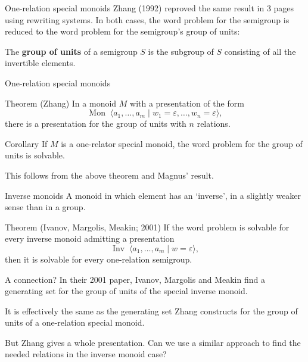 \documentclass{beamer}
\let\epsilon\varepsilon
\newcommand{\Mon}{\operatorname{Mon}\;}
\newcommand{\Inv}{\operatorname{Inv}\;}
\newcommand{\pskip}{\medskip}
\begin{document}
\begin{frame}{One-relation special monoids}
	Zhang (1992) reproved the same result in 3 pages using rewriting systems. In both cases, the word problem for the semigroup is reduced to the word problem for the semigroup's group of units:\pskip

	\pause
	The \textbf{group of units} of a semigroup $S$ is the subgroup of $S$ consisting of all the invertible elements.
\end{frame}

\begin{frame}{One-relation special monoids}
	\begin{block}{Theorem (Zhang)}
		In a monoid $M$ with a presentation of the form
			\[ \Mon \langle a_1, \ldots, a_m \mid w_1 = \epsilon, \ldots, w_n = \epsilon \rangle, \]
		there is a presentation for the group of units with $n$ relations.
	\end{block}

	\pause
	\begin{block}{Corollary}
		If $M$ is a one-relator special monoid, the word problem for the group of units is solvable.
	\end{block}

	This follows from the above theorem and Magnus' result.
\end{frame}


\begin{frame}{Inverse monoids}
	A monoid in which element has an `inverse', in a slightly weaker sense than in a group.

	\pause
	\begin{block}{Theorem (Ivanov, Margolis, Meakin; 2001)}
		If the word problem is solvable for every inverse monoid admitting a presentation
			\[ \Inv \langle a_1, \ldots, a_m \mid w = \epsilon \rangle, \]
		then it is solvable for every one-relation semigroup.
	\end{block}
\end{frame}

\begin{frame}{A connection?}
	In their 2001 paper, Ivanov, Margolis and Meakin find a generating set for the group of units of the special inverse monoid.\pskip
	
	It is effectively the same as the generating set Zhang constructs for the group of units of a one-relation special monoid.\pskip

	But Zhang gives a whole presentation. Can we use a similar approach to find the needed relations in the inverse monoid case?
\end{frame}
\end{document}
